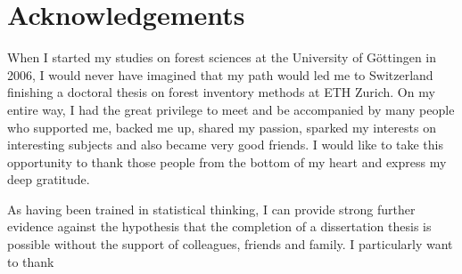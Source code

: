 \chapter*{Acknowledgements}

When I started my studies on forest sciences at the University of G{\"o}ttingen in 2006, I would never have imagined that my path would led me to Switzerland finishing a doctoral thesis on forest inventory methods at ETH Zurich. On my entire way, I had the great privilege to meet and be accompanied by many people who supported me, backed me up, shared my passion, sparked my interests on interesting subjects and also became very good friends. I would like to take this opportunity to thank those people from the bottom of my heart and express my deep gratitude.\par 

As having been trained in statistical thinking, I can provide strong further evidence against the hypothesis that the completion of a dissertation thesis is possible without the support of colleagues, friends and family. I particularly want to thank


